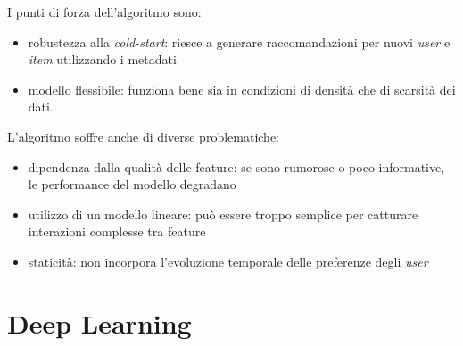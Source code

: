 I punti di forza dell'algoritmo sono:

\begin{itemize}
    \item robustezza alla \textit{cold-start}: riesce a generare raccomandazioni per nuovi \textit{user} e \textit{item} utilizzando i metadati
    \item modello flessibile: funziona bene sia in condizioni di densità che di scarsità dei dati.
\end{itemize}

L'algoritmo soffre anche di diverse problematiche:

\begin{itemize}
    \item dipendenza dalla qualità delle feature: se sono rumorose o poco informative, le performance del modello degradano
    \item utilizzo di un modello lineare: può essere troppo semplice per catturare interazioni complesse tra feature
    \item staticità: non incorpora l'evoluzione temporale delle preferenze degli \textit{user}
\end{itemize}

\section{Deep Learning}

